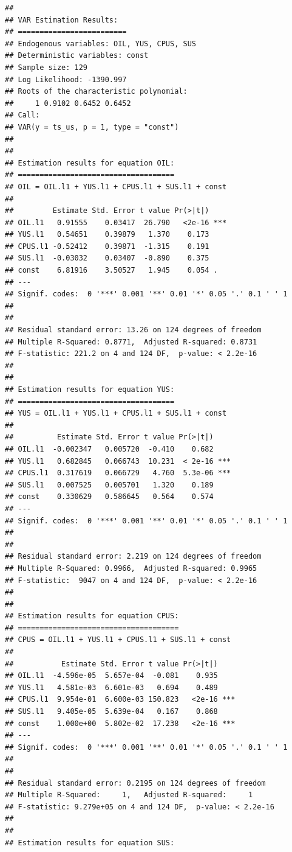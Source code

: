 \documentclass[11pt,preprint, authoryear]{elsarticle}
\numberwithin{equation}{section}
\numberwithin{figure}{section}
\numberwithin{table}{section}
\begin{document}
\begin{verbatim}
## 
## VAR Estimation Results:
## ========================= 
## Endogenous variables: OIL, YUS, CPUS, SUS 
## Deterministic variables: const 
## Sample size: 129 
## Log Likelihood: -1390.997 
## Roots of the characteristic polynomial:
##     1 0.9102 0.6452 0.6452
## Call:
## VAR(y = ts_us, p = 1, type = "const")
## 
## 
## Estimation results for equation OIL: 
## ==================================== 
## OIL = OIL.l1 + YUS.l1 + CPUS.l1 + SUS.l1 + const 
## 
##         Estimate Std. Error t value Pr(>|t|)    
## OIL.l1   0.91555    0.03417  26.790   <2e-16 ***
## YUS.l1   0.54651    0.39879   1.370    0.173    
## CPUS.l1 -0.52412    0.39871  -1.315    0.191    
## SUS.l1  -0.03032    0.03407  -0.890    0.375    
## const    6.81916    3.50527   1.945    0.054 .  
## ---
## Signif. codes:  0 '***' 0.001 '**' 0.01 '*' 0.05 '.' 0.1 ' ' 1
## 
## 
## Residual standard error: 13.26 on 124 degrees of freedom
## Multiple R-Squared: 0.8771,  Adjusted R-squared: 0.8731 
## F-statistic: 221.2 on 4 and 124 DF,  p-value: < 2.2e-16 
## 
## 
## Estimation results for equation YUS: 
## ==================================== 
## YUS = OIL.l1 + YUS.l1 + CPUS.l1 + SUS.l1 + const 
## 
##          Estimate Std. Error t value Pr(>|t|)    
## OIL.l1  -0.002347   0.005720  -0.410    0.682    
## YUS.l1   0.682845   0.066743  10.231  < 2e-16 ***
## CPUS.l1  0.317619   0.066729   4.760  5.3e-06 ***
## SUS.l1   0.007525   0.005701   1.320    0.189    
## const    0.330629   0.586645   0.564    0.574    
## ---
## Signif. codes:  0 '***' 0.001 '**' 0.01 '*' 0.05 '.' 0.1 ' ' 1
## 
## 
## Residual standard error: 2.219 on 124 degrees of freedom
## Multiple R-Squared: 0.9966,  Adjusted R-squared: 0.9965 
## F-statistic:  9047 on 4 and 124 DF,  p-value: < 2.2e-16 
## 
## 
## Estimation results for equation CPUS: 
## ===================================== 
## CPUS = OIL.l1 + YUS.l1 + CPUS.l1 + SUS.l1 + const 
## 
##           Estimate Std. Error t value Pr(>|t|)    
## OIL.l1  -4.596e-05  5.657e-04  -0.081    0.935    
## YUS.l1   4.581e-03  6.601e-03   0.694    0.489    
## CPUS.l1  9.954e-01  6.600e-03 150.823   <2e-16 ***
## SUS.l1   9.405e-05  5.639e-04   0.167    0.868    
## const    1.000e+00  5.802e-02  17.238   <2e-16 ***
## ---
## Signif. codes:  0 '***' 0.001 '**' 0.01 '*' 0.05 '.' 0.1 ' ' 1
## 
## 
## Residual standard error: 0.2195 on 124 degrees of freedom
## Multiple R-Squared:     1,   Adjusted R-squared:     1 
## F-statistic: 9.279e+05 on 4 and 124 DF,  p-value: < 2.2e-16 
## 
## 
## Estimation results for equation SUS: 

\end{verbatim}
\end{document}

